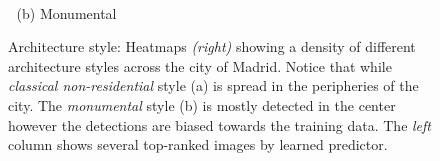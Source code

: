 \begin{figure}[t]
\begin{minipage}{\linewidth}
\begin{minipage}{0.7\linewidth}
    \end{minipage}
  \end{minipage}
  \\
  $\;$\hspace{30mm} (b) Monumental
  \\
  \caption{
    Architecture style: Heatmaps \emph{(right)} showing a density of different architecture styles across the city of Madrid. Notice that while \emph{classical non-residential} style (a) is spread in the peripheries of the city. The \emph{monumental} style (b) is mostly detected in the center however the detections are biased towards the training data. The \emph{left} column shows several top-ranked images by learned predictor.
  }
  \label{fig:heatArchitecture2}
\end{figure}